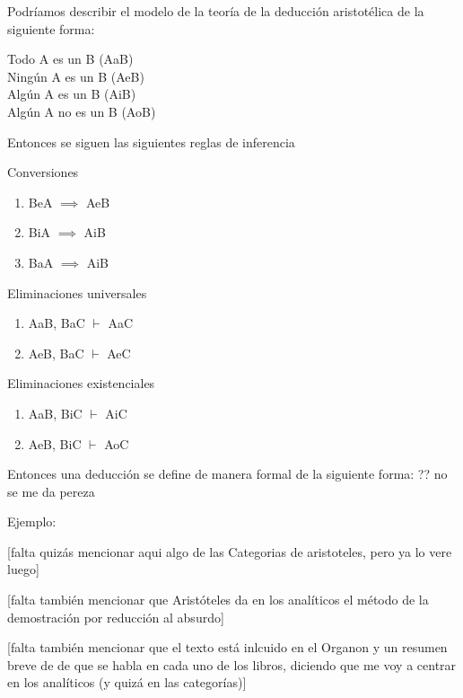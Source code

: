 \documentclass{article}
\begin{document}
Podríamos describir el modelo de la teoría de la deducción aristotélica de la siguiente forma:

\begin{displayquote}
Todo A es un B (AaB)\\
Ningún A es un B (AeB)\\
Algún A es un B (AiB)\\
Algún A no es un B (AoB)\\
\end{displayquote}

Entonces se siguen las siguientes reglas de inferencia

Conversiones

\begin{enumerate}
    \item BeA $\implies$ AeB
    \item BiA $\implies$ AiB
    \item BaA $\implies$ AiB
\end{enumerate}

Eliminaciones universales

\begin{enumerate}
    \item AaB, BaC $\vdash$ AaC
    \item AeB, BaC $\vdash$ AeC
\end{enumerate}

Eliminaciones existenciales

\begin{enumerate}
    \item AaB, BiC $\vdash$ AiC
    \item AeB, BiC $\vdash$ AoC
\end{enumerate}

Entonces una deducción se define de manera formal de la siguiente forma: ?? no se me da pereza

Ejemplo:

\cite{corcoran2009aristotle,smith1989prior}

[falta quizás mencionar aqui algo de las Categorias de aristoteles, pero ya lo vere luego]

[falta también mencionar que Aristóteles da en los analíticos el método de la demostración por reducción al absurdo]

[falta también mencionar que el texto está inlcuido en el Organon y un resumen breve de de que se habla en cada uno de los libros, diciendo que me voy a centrar en los analíticos (y quizá en las categorías)]
\end{document}
